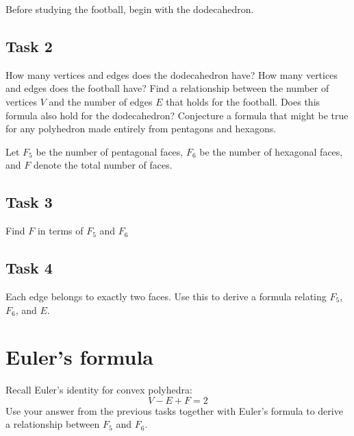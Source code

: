 \documentclass[12pt,a4paper]{tufte-handout}
\begin{document}
Before studying the football, begin with the dodecahedron.

\subsection{Task 2}
How many vertices and edges does the dodecahedron have? How many vertices and edges does the football have? Find a relationship between the number of vertices $V$ and the number of edges $E$ that holds for the football. Does this formula also hold for the dodecahedron? Conjecture a formula that might be true for any polyhedron made entirely from pentagons and hexagons.

Let $F_5$ be the number of pentagonal faces, $F_6$ be the number of hexagonal faces, and $F$ denote the total number of faces.

\subsection{Task 3}

Find $F$ in terms of $F_5$ and $F_6$

\subsection{Task 4}
Each edge belongs to exactly two faces. Use this to derive a formula relating $F_5$, $F_6$, and $E$. 

\section{Euler's formula}

Recall Euler's identity for convex polyhedra:
\begin{equation}
V- E + F= 2
\end{equation}
Use your answer from the previous tasks together with Euler's formula to derive a relationship between $F_5$ and $F_6$. 
\end{document}
